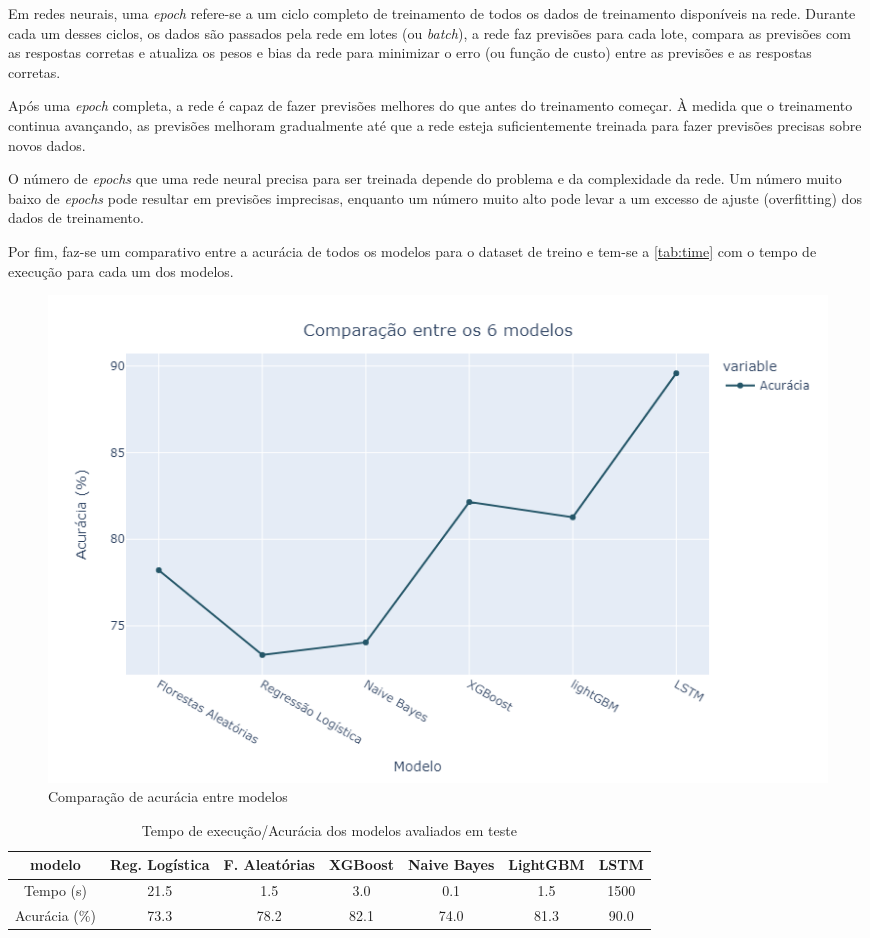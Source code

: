 Em redes neurais, uma \textit{epoch} refere-se a um ciclo completo de treinamento de todos os dados de treinamento disponíveis na rede. Durante cada um desses ciclos, os dados são passados pela rede em lotes (ou \textit{batch}), a rede faz previsões para cada lote, compara as previsões com as respostas corretas e atualiza os pesos e bias da rede para minimizar o erro (ou função de custo) entre as previsões e as respostas corretas.

Após uma \textit{epoch} completa, a rede é capaz de fazer previsões melhores do que antes do treinamento começar. À medida que o treinamento continua avançando, as previsões melhoram gradualmente até que a rede esteja suficientemente treinada para fazer previsões precisas sobre novos dados.

O número de \textit{epochs} que uma rede neural precisa para ser treinada depende do problema e da complexidade da rede. Um número muito baixo de \textit{epochs} pode resultar em previsões imprecisas, enquanto um número muito alto pode levar a um excesso de ajuste (overfitting) dos dados de treinamento.

Por fim, faz-se um comparativo entre a acurácia de todos os modelos para o dataset de treino e tem-se a \autoref{tab:time} com o tempo de execução para cada um dos modelos.

\begin{figure}[H]
    \centering
    \includegraphics[scale=0.55]{./figs/comparative.png}
    \caption{Comparação de acurácia entre modelos}
    \label{fig:comparative}
\end{figure}

\begin{table}[H]
    \centering
    \small
    \begin{tabular}{c|cccccc}
        \hline
        { modelo}        & { Reg. Logística} & { F. Aleatórias} & { XGBoost} & { Naive Bayes} & LightGBM & LSTM \\ \hline \hline
        { Tempo (s)}     & { 21.5}           & { 1.5}           & { 3.0}     & { 0.1}         & {1.5}    & 1500 \\ \hline
        { Acurácia (\%)} & { 73.3}           & { 78.2}          & { 82.1}    & { 74.0}        & 81.3     & 90.0 \\
    \end{tabular}
    \caption{Tempo de execução/Acurácia dos modelos avaliados em teste}
    \label{tab:time}
\end{table}

